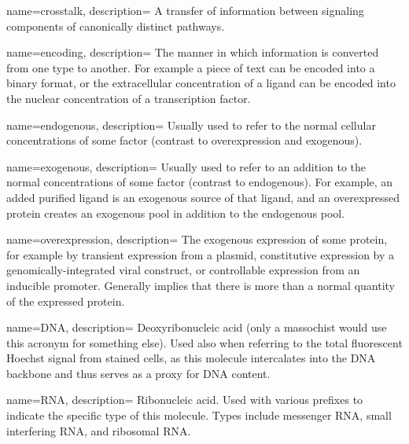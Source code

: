 {
  name=crosstalk,
  description={ A transfer of information between signaling components
				of canonically distinct pathways.}
}

{
  name=encoding,
  description={ The manner in which information is converted from one type
                to another. For example a piece of text can be encoded into
                a binary format, or the extracellular concentration of a ligand
                can be encoded into the nuclear concentration of a transcription
                factor.}
}

{
  name=endogenous,
  description={ Usually used to refer to the normal cellular
                concentrations of some factor (contrast to overexpression
                and exogenous).}
}


{
  name=exogenous,
  description={ Usually used to refer to an addition to the normal
                concentrations of some factor (contrast to endogenous).
                For example, an added purified ligand is an exogenous
                source of that ligand, and an overexpressed protein
                creates an exogenous pool in addition to the endogenous
                pool.}
}


{
  name=overexpression,
  description={ The exogenous expression of some protein, for example
                by transient expression from a plasmid, constitutive
                expression by a genomically-integrated viral construct,
                or controllable expression from an inducible promoter.
                Generally implies that there is more than a normal quantity of the expressed
                protein.}
}



{
  name=DNA,
  description={ Deoxyribonucleic acid (only a massochist would use this
                acronym for something else). Used also when referring
                to the total fluorescent Hoechst signal from stained cells, as 
                this molecule intercalates
                into the DNA backbone and thus serves as a proxy for DNA content.}
}

{
  name=RNA,
  description={ Ribonucleic acid. Used with various prefixes to indicate
                the specific type of this molecule. Types include messenger RNA,
                small interfering RNA, and ribosomal RNA.}
}

